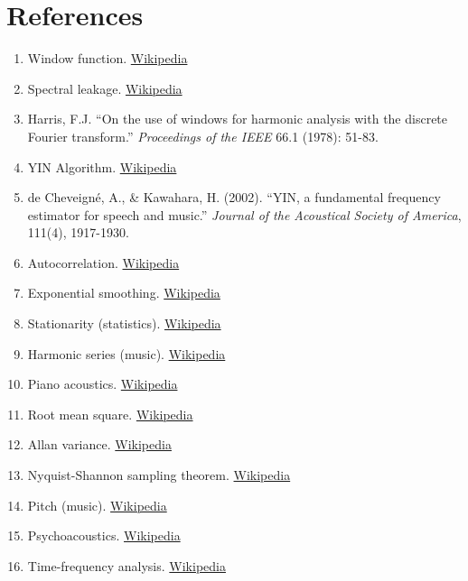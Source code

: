 \documentclass[11pt,a4paper]{article}
\begin{document}
\section{References}

\begin{enumerate}
    \item Window function. \href{https://en.wikipedia.org/wiki/Window_function}{Wikipedia}
    \item Spectral leakage. \href{https://en.wikipedia.org/wiki/Spectral_leakage}{Wikipedia}
    \item Harris, F.J. ``On the use of windows for harmonic analysis with the discrete Fourier transform.'' \textit{Proceedings of the IEEE} 66.1 (1978): 51-83.
    \item YIN Algorithm. \href{https://en.wikipedia.org/wiki/YIN_algorithm}{Wikipedia}
    \item de Cheveigné, A., \& Kawahara, H. (2002). ``YIN, a fundamental frequency estimator for speech and music.'' \textit{Journal of the Acoustical Society of America}, 111(4), 1917-1930.
    \item Autocorrelation. \href{https://en.wikipedia.org/wiki/Autocorrelation}{Wikipedia}
    \item Exponential smoothing. \href{https://en.wikipedia.org/wiki/Exponential_smoothing}{Wikipedia}
    \item Stationarity (statistics). \href{https://en.wikipedia.org/wiki/Stationary_process}{Wikipedia}
    \item Harmonic series (music). \href{https://en.wikipedia.org/wiki/Harmonic_series_(music)}{Wikipedia}
    \item Piano acoustics. \href{https://en.wikipedia.org/wiki/Piano_acoustics}{Wikipedia}
    \item Root mean square. \href{https://en.wikipedia.org/wiki/Root_mean_square}{Wikipedia}
    \item Allan variance. \href{https://en.wikipedia.org/wiki/Allan_variance}{Wikipedia}
    \item Nyquist-Shannon sampling theorem. \href{https://en.wikipedia.org/wiki/Nyquist\%E2\%80\%93Shannon_sampling_theorem}{Wikipedia}
    \item Pitch (music). \href{https://en.wikipedia.org/wiki/Pitch_(music)}{Wikipedia}
    \item Psychoacoustics. \href{https://en.wikipedia.org/wiki/Psychoacoustics}{Wikipedia}
    \item Time-frequency analysis. \href{https://en.wikipedia.org/wiki/Time\%E2\%80\%93frequency_analysis}{Wikipedia}

\end{enumerate}
\end{document}
